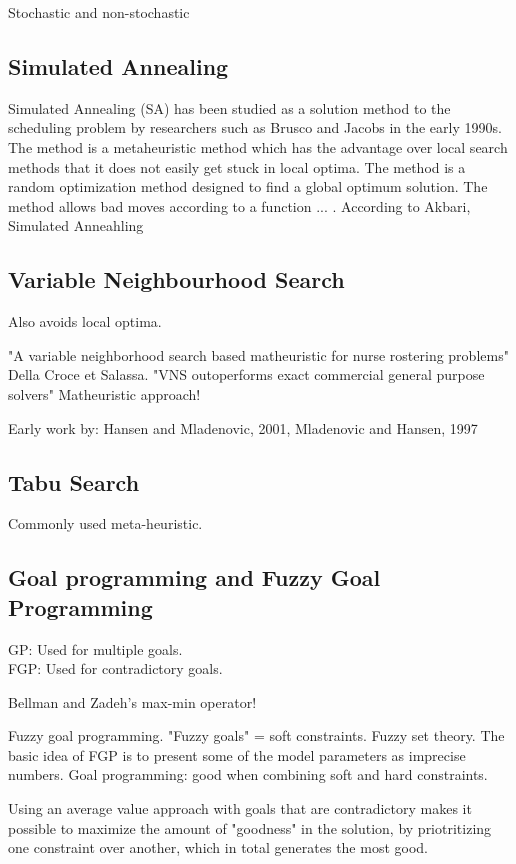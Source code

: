 
Stochastic and non-stochastic

\subsection{Simulated Annealing}

Simulated Annealing (SA) has been studied as a solution method to the scheduling problem by researchers such as Brusco and Jacobs in the early 1990s. The method is a metaheuristic method which has the advantage over local search methods that it does not easily get stuck in local optima. The method is a random optimization method designed to find a global optimum solution. The method allows bad moves according to a function ... . 
According to Akbari, Simulated Anneahling 

\subsection{Variable Neighbourhood Search}

Also avoids local optima. 

"A variable neighborhood search based matheuristic for nurse rostering problems" Della Croce et Salassa. "VNS outoperforms exact commercial general purpose solvers"
Matheuristic approach!

Early work by:
Hansen  and  Mladenovic, 2001, Mladenovic and Hansen, 1997

\subsection{Tabu Search}

Commonly used meta-heuristic.

\subsection{Goal programming and Fuzzy Goal Programming}

GP: Used for multiple goals. \\
FGP: Used for contradictory goals.

Bellman and Zadeh's max-min operator!

Fuzzy goal programming.  "Fuzzy goals" = soft constraints. Fuzzy set theory. The basic idea of FGP is to present some of the model parameters as imprecise numbers.
Goal programming: good when combining soft and hard constraints.

Using an average value approach with goals that are contradictory makes it possible to maximize the amount of "goodness" in the solution, by priotritizing one constraint over another, which in total generates the most good.


\fi